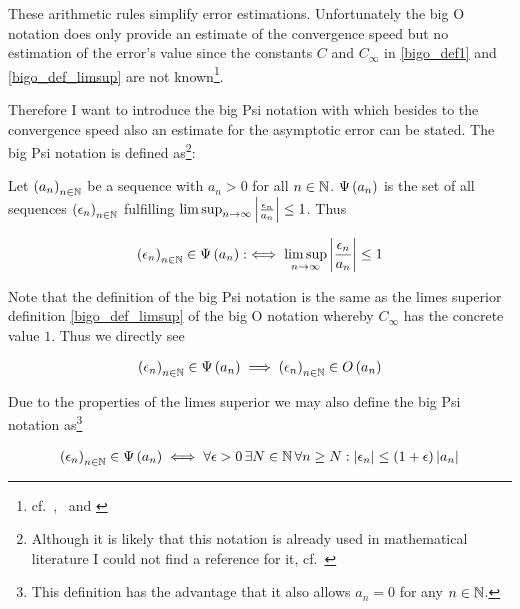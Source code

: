 These arithmetic rules simplify error estimations. Unfortunately the big O notation does only provide an estimate of the convergence speed but no estimation of the error's value since the constants $C$ and $C_\infty$ in \eqref{bigo_def1} and \eqref{bigo_def_limsup} are not known\footnote{cf.~\cite[p.~444]{graham},~\cite{hurkyl_bigo} and \cite{templatetypedef_bigo}}.

Therefore I want to introduce the big Psi notation with which besides to the convergence speed also an estimate for the asymptotic error can be stated. The big Psi notation is defined as\footnote{Although it is likely that this notation is already used in mathematical literature I could not find a reference for it, cf.~\cite{tampis_bigpsi}}:

\begin{definition}
  Let $\left({a_n}\right)_{{n}\in\mathbb N}$ be a sequence with $a_n > 0$ for all $n\in\mathbb N$. $\Psi\left( {a_n} \right)$ is the set of all sequences $\left({\epsilon_n}\right)_{{n}\in\mathbb N}$ fulfilling $\limsup_{n\to\infty} \left|{\frac{\epsilon_n}{a_n}}\right| \le 1$. Thus

  \begin{align}
    \left({\epsilon_n}\right)_{{n}\in\mathbb N} \in \Psi\left( {a_n} \right) :\iff \limsup_{n\to\infty} \left|{\frac{\epsilon_n}{a_n}}\right| \le 1
  \end{align}

\end{definition}

Note that the definition of the big Psi notation is the same as the limes superior definition \eqref{bigo_def_limsup} of the big O notation whereby $C_\infty$ has the concrete value $1$. Thus we directly see

\begin{align}
  \left({\epsilon_n}\right)_{{n}\in\mathbb N} \in \Psi\left( {a_n} \right) \implies \left({\epsilon_n}\right)_{{n}\in\mathbb N} \in O\left( {a_n} \right)
\end{align}

\noindent Due to the properties of the limes superior we may also define the big Psi notation as\footnote{This definition has the advantage that it also allows $a_n=0$ for any $n\in\mathbb N$.}


\begin{align}
  \left({\epsilon_n}\right)_{{n}\in\mathbb N} \in \Psi\left( {a_n} \right) \iff \forall \epsilon > 0\, \exists N \in \mathbb N\, \forall n\ge N: \left|{\epsilon_n}\right| \le (1+\epsilon)\left|{a_n}\right|
\end{align}

